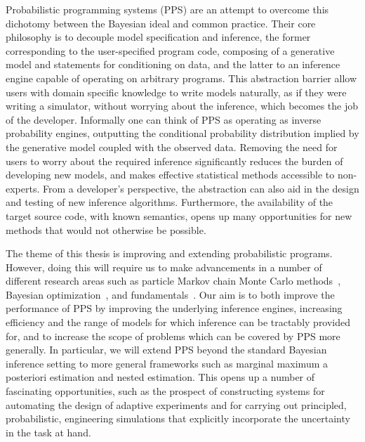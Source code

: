 Probabilistic programming systems (PPS) \citep{goodman2008church} are an attempt to
overcome this dichotomy between the Bayesian ideal and common practice.  Their core philosophy 
is to decouple model specification and inference, the former corresponding to the user-specified 
program code, composing of a generative model and statements for conditioning on data, and the 
latter to an inference engine capable of operating on arbitrary programs.  This abstraction barrier 
allow users with domain specific knowledge to write models naturally, as if they were writing a 
simulator, without worrying about the inference, which becomes the job of the developer. Informally 
one can think of PPS as operating as inverse probability engines, outputting the conditional 
probability distribution implied by the generative model coupled with the observed data.
Removing the need for users to worry about the required inference significantly reduces the 
burden of developing new models, and makes effective statistical methods accessible to 
non-experts.  From a developer's perspective, the abstraction can also aid in the design 
and testing of new inference algorithms.  Furthermore, the availability of the target source 
code, with known semantics, opens up many opportunities for new methods that would
not otherwise be possible.

The theme of this thesis is improving and extending probabilistic programs.  However,
doing this will require us to make advancements in a number of different research areas such
as particle Markov chain Monte Carlo methods~\citep{andrieu2010particle,rainforth2016interacting},
Bayesian optimization~\citep{movckus1975bayesian,rainforth2016bayesian}, and \mc
fundamentals~\cite{metropolis1949monte,rainforth2016pitfalls}.  Our aim is to both improve
the performance of PPS by improving the underlying inference engines, increasing
efficiency and the range of models for which inference can be tractably provided for, and to increase
the scope of problems which can be covered by PPS more generally.  In particular, we
will extend PPS beyond the standard Bayesian inference setting to more general frameworks
such as marginal maximum a posteriori estimation and nested estimation.  This opens up a number
of fascinating opportunities, such as the prospect of constructing systems for automating the
design of adaptive experiments and for carrying out principled, probabilistic, engineering simulations
that explicitly incorporate the uncertainty in the task at hand.

